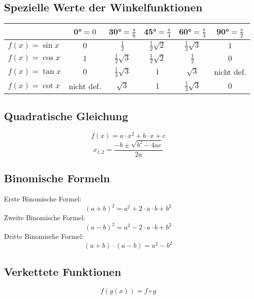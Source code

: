 \subsection{Spezielle Werte der Winkelfunktionen}
\begin{tabular}{|l|c|c|c|c|c|}
\hline              & 0°$ = 0$ & 30°$ = \frac{\pi}{6}$ & 45°$ = \frac{\pi}{4}$ & 60°$ = \frac{\pi}{3}$ & 90°$ = \frac{\pi}{2}$ \\
\hline $f\left(x\right)=\sin x$ & $0$ & $\frac{1}{2}$ & $\frac{1}{2}\sqrt{2}$ & $\frac{1}{2}\sqrt{3}$ & $1$ \\
\hline $f\left(x\right)=\cos x$ & $1$ & $\frac{1}{2}\sqrt{3}$ & $\frac{1}{2}\sqrt{2}$ & $\frac{1}{2}$ & $0$ \\
\hline $f\left(x\right)=\tan x$ & $0$ & $\frac{1}{3}\sqrt{3}$ & $1$ & $\sqrt{3}$ & nicht def. \\
\hline $f\left(x\right)=\cot x$ & nicht def. & $\sqrt{3}$ & $1$ & $\frac{1}{3}\sqrt{3}$ & $0$ \\
\hline \end{tabular}

\subsection{Quadratische Gleichung}
\[ \boxed{f(x) = a \cdot x^2 + b \cdot x + c} \]
\[ \boxed{x_{1,2}=\frac{-b\pm\sqrt{b^2-4ac}}{2a}} \]

\subsection{Binomische Formeln}
Erste Binomische Formel: 
\[ \boxed{(a + b)^2 = a^2 + 2 \cdot a \cdot b + b^2} \]Zweite Binomische Formel: 
\[ \boxed{(a - b)^2 = a^2 - 2 \cdot a \cdot b + b^2} \]Dritte Binomische Formel: 
\[ \boxed{(a + b) \cdot (a - b) = a^2 - b^2} \]

\subsection{Verkettete Funktionen}
\[ \boxed{f(g(x)) = f \circ g} \]